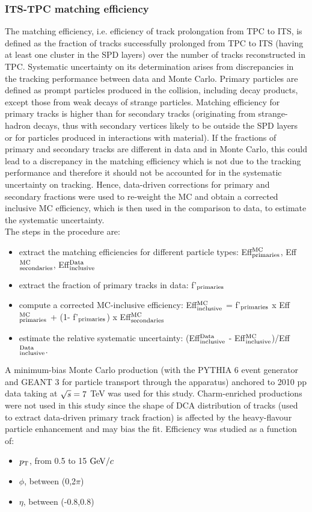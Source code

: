 \subsubsection{ITS-TPC matching efficiency}
\label{sec:MEpp}
The matching efficiency, i.e. efficiency of track prolongation from TPC to ITS, 
is defined as the fraction of tracks successfully prolonged from TPC to ITS (having
at least one cluster in the SPD layers)
over the number of tracks reconstructed in TPC.
Systematic uncertainty on its determination arises from discrepancies 
in the tracking performance between data and Monte Carlo.
Primary particles are defined as 
prompt particles produced in the collision, including decay products, 
except those from weak decays of strange particles. Matching efficiency for primary tracks is higher than 
for secondary tracks (originating from strange-hadron decays, thus 
with secondary vertices likely to be outside the SPD layers or for particles produced
in interactions with material). 
If the fractions of primary and secondary tracks are different in data 
and in Monte Carlo, this could lead to a discrepancy in the matching efficiency
which is not due to the tracking performance and therefore it should not be
accounted for in the systematic uncertainty on tracking. Hence,
data-driven corrections for primary and secondary fractions were used to re-weight the MC
and obtain a corrected inclusive MC efficiency, which is then used in the
comparison to data, to estimate the systematic uncertainty.\\
The steps in the procedure are:
\begin{itemize}
\item extract the matching efficiencies for different particle types: 
Eff$^{\rm MC}_{\rm primaries}$, Eff$^{\rm MC}_{\rm secondaries}$, Eff$^{\rm Data}_{\rm inclusive}$
\item extract the fraction of primary tracks in data: f'$_{\rm primaries}$
\item compute a corrected MC-inclusive efficiency: 
Eff$^{\rm MC}_{\rm inclusive}$ = f'$_{\rm primaries}$ x Eff$^{\rm MC}_{\rm primaries}$ + (1- f'$_{\rm primaries}$) x Eff$^{\rm MC}_{\rm secondaries}$
\item estimate the relative systematic uncertainty: 
(Eff$^{\rm Data}_{\rm inclusive}$ - Eff$^{\rm MC}_{\rm inclusive}$)/Eff$^{\rm Data}_{\rm inclusive}$.
\end{itemize}
A minimum-bias Monte Carlo production (with the PYTHIA 6 event generator and
GEANT 3 for particle transport through the apparatus) anchored to 2010 pp data taking at 
$\sqrt{s} = 7$ TeV was used for this study. Charm-enriched productions were not used in this study 
since the shape of DCA distribution of tracks (used to extract data-driven 
primary track fraction) is affected by the heavy-flavour particle enhancement
and may bias the fit.
Efficiency was studied as a function of:
\begin{itemize}
\item $p_{\rm T}$, from 0.5 to 15 $\mathrm{GeV}/c$
\item $\phi$, between (0,2$\pi$)
\item $\eta$, between (-0.8,0.8)
\end{itemize}


